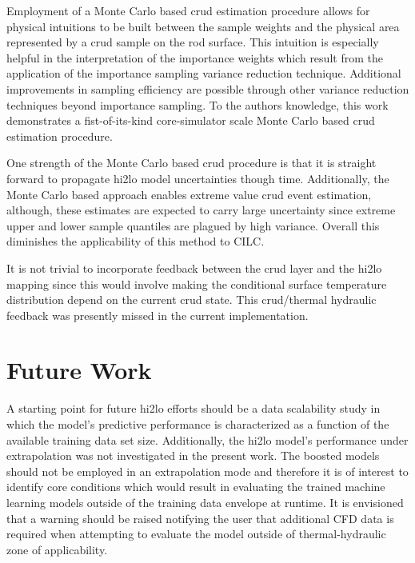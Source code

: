 Employment of a Monte Carlo based crud estimation procedure allows for physical intuitions to be built between the sample weights and the physical area represented by a crud sample on the rod surface.  This intuition is especially helpful in the interpretation of the importance weights which result from the application of the importance sampling variance reduction technique.  Additional improvements in sampling efficiency are possible through other variance reduction techniques beyond importance sampling.  To the authors knowledge, this work demonstrates a fist-of-its-kind core-simulator scale Monte Carlo based crud estimation procedure.

One strength of the Monte Carlo based crud procedure is that it is straight forward to propagate hi2lo model uncertainties though time.  Additionally, the Monte Carlo based approach enables extreme value crud event estimation, although, these estimates are expected to carry large uncertainty since extreme upper and lower sample quantiles are plagued by high variance.  Overall this diminishes the applicability of this method to CILC.  

It is not trivial to incorporate feedback between the crud layer and the hi2lo mapping since this would involve making the conditional surface temperature distribution depend on the current crud state.  This crud/thermal hydraulic feedback was presently missed in the current implementation.


\section{Future Work}

A starting point for future hi2lo efforts should be a data scalability study in which the model's predictive performance is characterized as a function of the available training data set size.  Additionally,
the hi2lo model's performance under extrapolation was not investigated in the present work.  The boosted models should not be employed in an extrapolation mode and therefore it is of interest to identify core conditions which would result in evaluating the trained machine learning models outside of the training data envelope at runtime.  It is envisioned that a warning should be raised notifying the user that additional CFD data is required when attempting to evaluate the model outside of thermal-hydraulic zone of applicability.


